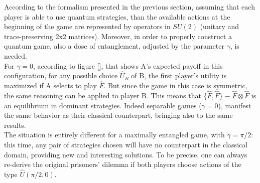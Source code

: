According to the formalism presented in the previous section, assuming that each player is able to use quantum strategies, than the available actions at the beginning of the game are represented by operators in $SU(2)$ (unitary and trace-preserving 2x2 matrices). Moreover, in order to properly construct a quantum game, also a dose of entanglement, adjusted by the parameter $\gamma$, is needed.\\
For $\gamma=0$, according to figure \ref{}, that shows A's expected payoff in this configuration, for any possible choice $\hat{U}_B$ of B, the first player's utility is maximized if A selects to play $\hat{F}$. But since the game in this case is symmetric, the same reasoning can be applied to player B. This means that $\{\hat{F},\hat{F}\}\equiv\hat{F}\otimes\hat{F}$ is an equilibrium in dominant strategies. Indeed separable games ($\gamma=0$), manifest the same behavior as their classical counterpart, bringing also to the same results.\\
The situation is entirely different for a maximally entangled game, with $\gamma=\pi/2$: this time, any pair of strategies chosen will have no counterpart in the classical domain, providing new and interesting solutions. To be precise, one can always re-derive the original prisoners' dilemma if both players choose actions of the type $\hat{U}(\pi/2,0)$.






